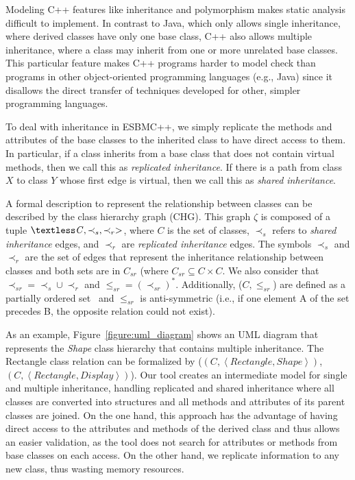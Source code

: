 \documentclass[conference]{IEEEtran}
\begin{document}
Modeling C++ features like inheritance and polymorphism
makes static analysis difficult to implement.
In contrast to Java, which only allows single inheritance, where derived classes
have only one base class, C++ also allows multiple inheritance, where a class
may inherit from one or more unrelated base classes. This particular feature
makes C++ programs harder to model check than programs in other object-oriented
programming languages (e.g., Java) since it disallows the direct transfer of
techniques developed for other, simpler programming languages.

To deal with inheritance in ESBMC++, we simply replicate the methods
and attributes of the base classes to the inherited class to have
direct access to them. In particular, if a class inherits from
a base class that does not contain virtual methods,
then we call this as \textit{replicated inheritance}. If there is a path from
class $\mathit{X}$ to class $\mathit{Y}$ whose first edge is virtual, then
we call this as \textit{shared inheritance}.

A formal description to represent
the relationship between classes can be described by the class hierarchy graph
(CHG). This graph $\zeta$ is composed of a tuple $\textless \mathit{C}, \prec_{s}, \prec_{r}>$,
where $\mathit{C}$ is the set of classes, $\prec_s $ refers to \textit{shared inheritance} edges,
and $\prec_r$ are \textit{replicated inheritance} edges. The symbols $\prec_{s}$ and $\prec_{r}$
are the set of edges that represent the inheritance relationship between
classes and both sets are in $\mathit{C_{sr}}$ (where $\mathit{C_{sr}} \subseteq \mathit{C} \times \mathit{C}$.
We also consider that $\prec_{sr} = \prec_s \cup \prec_r$ and $\leq_{sr} = (\prec_{sr})^*$.
Additionally, ($\mathit{C}, \leq_{sr}$) are defined as a partially ordered set~\cite{Neggers99}
and $\leq_{sr}$ is anti-symmetric (i.e., if one element A of the set precedes B,
the opposite relation could not exist).

As an example, Figure~\ref{figure:uml_diagram} shows an UML diagram
that represents the \textit{Shape} class hierarchy that contains multiple inheritance.
The Rectangle class relation can be formalized by
($\left(C, \left\langle Rectangle, Shape \right\rangle \right)$,
$\left(C, \left\langle Rectangle, Display \right\rangle \right)$).
Our tool creates an intermediate model for single and multiple inheritance, handling
replicated and shared inheritance where all classes are converted into structures and all
methods and attributes of its parent classes are joined. On the one hand, this approach has
the advantage of having direct access to the attributes and methods
of the derived class and thus allows an easier validation, as the tool
does not search for attributes or methods from base classes on each access.
On the other hand, we replicate information to any new class, thus wasting
memory resources.
\end{document}
